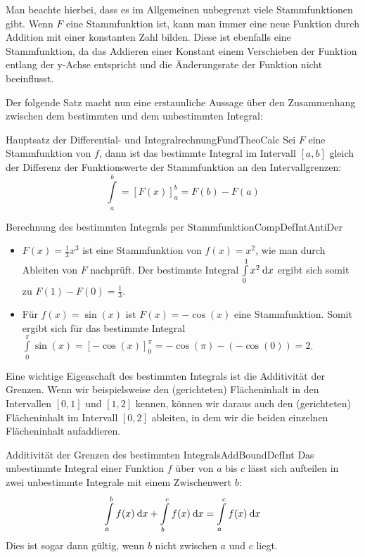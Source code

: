 Man beachte hierbei, dass es im Allgemeinen unbegrenzt viele Stammfunktionen gibt. Wenn $F$ eine Stammfunktion ist, kann man immer eine neue Funktion durch Addition mit einer konstanten Zahl bilden. Diese ist ebenfalls eine Stammfunktion, da das Addieren einer Konstant einem Verschieben der Funktion entlang der y-Achse entspricht und die Änderungsrate der Funktion nicht beeinflusst.

Der folgende Satz macht nun eine erstaunliche Aussage über den Zusammenhang zwischen dem bestimmten und dem unbestimmten Integral:

\begin{definition}{Hauptsatz der Differential- und Integralrechnung}{FundTheoCalc}
    Sei $F$ eine Stammfunktion von $f$, dann ist das bestimmte Integral im Intervall $[a,b]$  gleich der Differenz der Funktionswerte der Stammfunktion an den Intervallgrenzen:
    $$
        \int\limits_a^b = \left[F(x)\right]_a^b = F(b) - F(a)
    $$
\end{definition}

\begin{example}{Berechnung des bestimmten Integrals per Stammfunktion}{CompDefIntAntiDer}
    \begin{itemize}
        \item $F(x) = \frac{1}{3}x^3$ ist eine Stammfunktion von $f(x)=x^2$, wie man durch Ableiten von $F$ nachprüft. Der bestimmte Integral $\int\limits_0^1 x^2 \:\mathrm{d}{x}$ ergibt sich somit zu $F(1)-F(0) = \frac{1}{3}$.
        \item Für $f(x) = \sin(x)$ ist $F(x) = -\cos(x)$ eine Stammfunktion. Somit ergibt sich für das bestimmte Integral $\int\limits_0^\pi \sin(x) = \left[-\cos(x)\right]_0^\pi = -\cos(\pi) - (-\cos(0)) = 2$.
    \end{itemize}
\end{example}

Eine wichtige Eigenschaft des bestimmten Integrals ist die Additivität der Grenzen. Wenn wir beispielsweise den (gerichteten) Flächeninhalt in den Intervallen $[0,1]$ und $[1,2]$ kennen, können wir daraus auch den (gerichteten) Flächeninhalt im Intervall $[0,2]$ ableiten, in dem wir die beiden einzelnen Flächeninhalt aufaddieren.

\begin{statement}{Additivität der Grenzen des bestimmten Integrals}{AddBoundDefInt}
    Das unbestimmte Integral einer Funktion $f$ über von $a$ bis $c$ lässt sich aufteilen in zwei unbestimmte Integrale mit einem Zwischenwert $b$:
    $$
    \int\limits_a^b f(x) \:\mathrm{d}{x} + \int\limits_b^c f(x) \:\mathrm{d}{x} = \int\limits_a^c f(x) \:\mathrm{d}{x}
    $$
    Dies ist sogar dann gültig, wenn $b$ nicht zwischen $a$ und $c$ liegt.
\end{statement}

